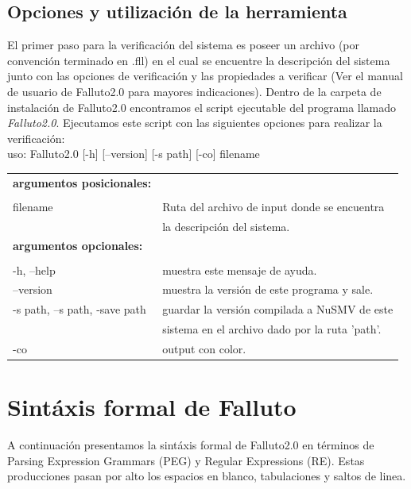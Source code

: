 \documentclass[pdftex,a4paper,12pt]{book}
\begin{document}
\section{Opciones y utilizaci\'on de la herramienta}
El primer paso para la verificaci\'on del sistema es poseer un archivo (por convenci\'on terminado en .fll) en el cual se encuentre la descripci\'on del sistema junto con las opciones de verificaci\'on y las propiedades a verificar (Ver el manual de usuario de Falluto2.0 para mayores indicaciones). Dentro de la carpeta de instalaci\'on de Falluto2.0 encontramos el script ejecutable del programa llamado \textit{Falluto2.0}. Ejecutamos este script con las siguientes opciones para realizar la verificaci\'on:\\


\noindent uso: Falluto2.0 [-h] [--version] [-s path] [-co] filename\\


\begin{tabular}{ll}
\textbf{argumentos posicionales:}\\\\
filename & Ruta del archivo de input donde se encuentra \\
         & la descripci\'on del sistema.\\
\textbf{argumentos opcionales:} & \\\\
-h, --help          & muestra este mensaje de ayuda.\\
--version           & muestra la versi\'on de este programa y sale.\\
-s path, --s path, -save path & guardar la versi\'on compilada a NuSMV de este \\
                              & sistema en el archivo dado por la ruta 'path'.\\
-co                 & output con color.\\
\end{tabular}





\chapter{Sint\'axis formal de Falluto}
\label{sintaxisFormal}

A continuaci\'on presentamos la sint\'axis formal de Falluto2.0 en t\'erminos de Parsing Expression Grammars (PEG) y Regular Expressions (RE). Estas producciones pasan por alto los espacios en blanco, tabulaciones y saltos de linea.
\end{document}
